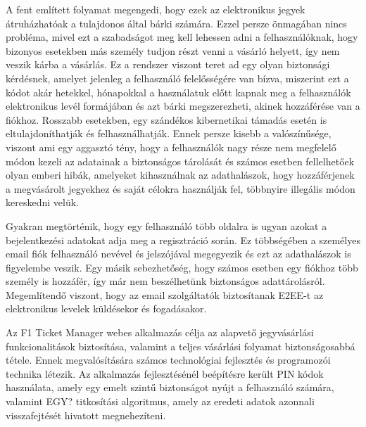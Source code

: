 A fent említett folyamat megengedi, hogy ezek az elektronikus jegyek átruházhatóak a tulajdonos által bárki számára. Ezzel persze önmagában nincs probléma, mivel ezt a szabadságot meg kell lehessen adni a felhasználóknak, hogy bizonyos esetekben más személy tudjon részt venni a vásárló helyett, így nem veszik kárba a vásárlás. Ez a rendszer viszont teret ad egy olyan biztonsági kérdésnek, amelyet jelenleg a felhasználó felelősségére van bízva, miszerint ezt a kódot akár hetekkel, hónapokkal a használatuk előtt kapnak meg a felhasználók elektronikus levél formájában és azt bárki megszerezheti, akinek hozzáférése van a fiókhoz. Rosszabb esetekben, egy szándékos kibernetikai támadás esetén is eltulajdoníthatják és felhasználhatják. Ennek persze kisebb a valószínűsége, viszont ami egy aggasztó tény, hogy a felhasználók nagy része nem megfelelő módon kezeli az adatainak a biztonságos tárolását és számos esetben fellelhetőek olyan emberi hibák, amelyeket kihasználnak az adathalászok, hogy hozzáférjenek a megvásárolt jegyekhez és saját célokra használják fel, többnyire illegális módon kereskedni velük.

\pagebreak
Gyakran megtörténik, hogy egy felhasználó több oldalra is ugyan azokat a bejelentkezési adatokat adja meg a regisztráció során. Ez többségében a személyes email fiók felhasználó nevével és jelszójával megegyezik és ezt az adathalászok is figyelembe veszik. Egy másik sebezhetőség, hogy számos esetben egy fiókhoz több személy is hozzáfér, így már nem beszélhetünk biztonságos adattárolásról. Megemlítendő viszont, hogy az email szolgáltatók biztosítanak E2EE-t az elektronikus levelek küldésekor és fogadásakor.

Az F1 Ticket Manager webes alkalmazás célja az alapvető jegyvásárlási funkcionalitások biztosítása, valamint a teljes vásárlási folyamat biztonságosabbá tétele. Ennek megvalósítására számos technológiai fejlesztés és programozói technika létezik. Az alkalmazás fejlesztésénél beépítésre került PIN kódok használata, amely egy emelt szintű biztonságot nyújt a felhasználó számára, valamint EGY? titkosítási algoritmus, amely az eredeti adatok azonnali visszafejtését hivatott megnehezíteni. 